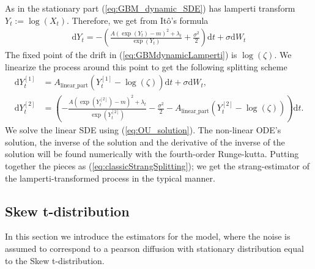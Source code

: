 As in the stationary part (\ref{eq:GBM_dynamic_SDE}) has lamperti transform $Y_t:=\log(X_t)$. Therefore, we get from Itô's formula
\begin{align}
    \mathrm{d}Y_t = - \left(\frac{A\left(\exp\left(Y_t\right)-m\right)^2 + \lambda_t}{\exp(Y_t)} + \frac{\sigma^2}{2}\right)\mathrm{d}t + \sigma \mathrm{d}W_t \label{eq:GBMdynamicLamperti}
\end{align}
The fixed point of the drift in (\ref{eq:GBMdynamicLamperti}) is $\log\left(\zeta\right)$. We linearize the process around this point to get the following splitting scheme
\begin{align}
    \mathrm{d}Y_t^{[1]} &= A_{\mathrm{linear\_part}}\left(Y_t^{[1]} - \log\left(\zeta\right)\right)\mathrm{d}t + \sigma \mathrm{d}W_t,\\
    \mathrm{d}Y_t^{[2]} &= \left(-\frac{A\left(\exp\left(Y_t^{[2]}\right)-m\right)^2 + \lambda_t}{\exp\left(Y_t^{[2]}\right)} - \frac{\sigma^2}{2}%
    - A_{\mathrm{linear\_part}}\left(Y_t^{[2]} - \log\left(\zeta\right)\right)\right)\mathrm{d}t. \label{eq:GBMLampertiBasedStrang}
\end{align}
We solve the linear SDE using (\ref{eq:OU_solution}). The non-linear ODE's solution, the inverse of the solution and the derivative of the inverse of the solution will be found numerically with the fourth-order Runge-kutta. Putting together the pieces as (\ref{eq:classicStrangSplitting}); we get the strang-estimator of the lamperti-transformed process in the typical manner.
\subsection{Skew t-distribution}
In this section we introduce the estimators for the model, where the noise is assumed to correspond to a pearson diffusion with stationary distribution equal to the Skew t-distribution.
